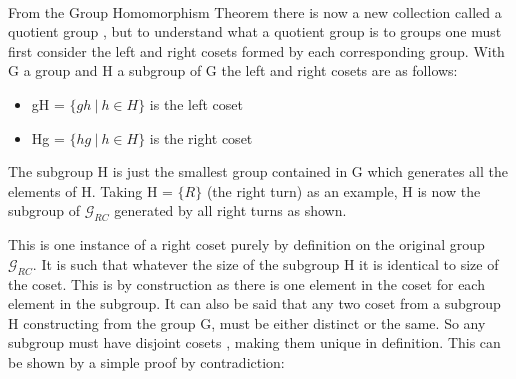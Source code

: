 \documentclass{article}
\begin{document}
\paragraph{} From the Group Homomorphism Theorem there is now a new collection called a quotient group , but to understand what a quotient group is to groups one must first consider the left and right cosets formed by each corresponding group.	
With G a group and H a subgroup of G the left and right cosets are as follows:
\begin{itemize}
\item gH = $\{gh\ |\ h \in H\}$ is the left coset 
\item Hg = $\{hg\ |\ h \in H\}$ is the right coset 
\end{itemize}
The subgroup H is just the smallest group contained in G which generates all the elements of H. Taking H = $\{R\}$ (the right turn) as an example, H is now the subgroup of $\mathcal{G}_{RC}$ generated by all right turns as shown. 
\vspace{-20pt}
\begin{figure}[hbt]
\centering%
\hspace{-12cm}
%
\end{figure}
\vspace{20pt}
This is one instance of a right coset purely by definition on the original group $\mathcal{G}_{RC}$. It is such that whatever the size of the subgroup H it is identical to size of the coset. This is by construction as there is one element in the coset for each element in the subgroup.
It can also be said that any two coset from a subgroup H constructing from the group G, must be either distinct or the same. So any subgroup must have disjoint cosets , making them unique in definition. This can be shown by a simple proof by contradiction:
\end{document}
